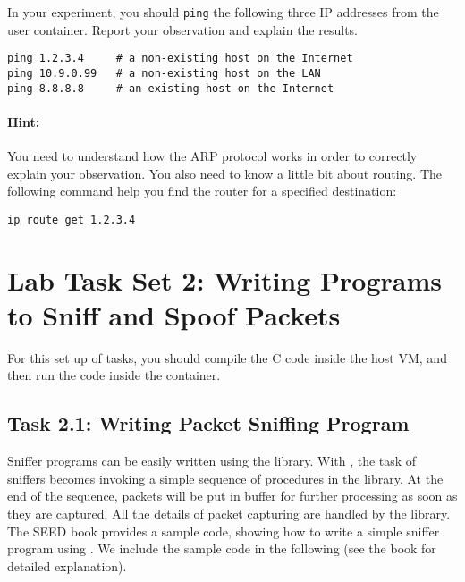 In your experiment, you should \texttt{ping} the following three IP addresses
from the user container. 
Report your observation and explain the results. 

\begin{lstlisting}
ping 1.2.3.4     # a non-existing host on the Internet
ping 10.9.0.99   # a non-existing host on the LAN
ping 8.8.8.8     # an existing host on the Internet
\end{lstlisting}

\paragraph{Hint:} You need to understand how the ARP protocol works in order to 
correctly explain your observation. You also need to know a little bit 
about routing. The following command help you find the router
for a specified destination:

\begin{lstlisting}
ip route get 1.2.3.4 
\end{lstlisting}
 
 


\section{Lab Task Set 2: Writing Programs to Sniff and Spoof Packets}

For this set up of tasks, you should compile the C code 
inside the host VM, and then run the code inside the container. 

\subsection{Task 2.1: Writing Packet Sniffing Program}

Sniffer programs can be easily written using the \pcap library. With \pcap, 
the task of 
sniffers becomes invoking a simple sequence of procedures
in the \pcap library. At the end of the sequence,
packets will be put in buffer for further processing
as soon as they are captured. All the details 
of packet capturing are handled by the \pcap library.
The SEED book provides a sample code, showing how  to write a simple sniffer program using 
\pcap. We include the sample code in the following (see the book for detailed explanation). 

